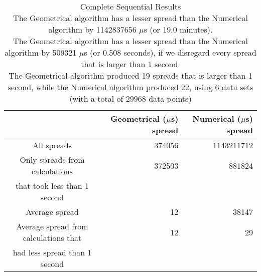 \begin{table}[bth!]\footnotesize
 \begin{tabular}[3]{c|r|r}
 & Geometrical ($\mu$s) spread & Numerical ($\mu$s) spread\\
\hline
All spreads & 374056 & 1143211712 \\ 
\hline 
Only spreads from calculations & 372503 & 881824 \\ 
that took less than 1 second & & \\ 
\hline
Average spread & 12 & 38147 \\
\hline
Average spread from calculations that & 12 & 29 \\ 
had less spread than 1 second & & \\ 
\end{tabular}\\ \\
\caption{Complete Sequential Results\\
The Geometrical algorithm has a lesser spread than the Numerical algorithm by 1142837656 $\mu$s (or 19.0 minutes).\\
The Geometrical algorithm has a lesser spread than the Numerical algorithm by 509321 $\mu$s (or 0.508 seconds), if we disregard every spread that is larger than 1 second.\\
The Geometrical algorithm produced 19 spreads that is larger than 1 second, while the Numerical algorithm produced 22, using 6 data sets (with a total of 29968 data points)\\
}\label{sequential_spreadtable}\end{table}